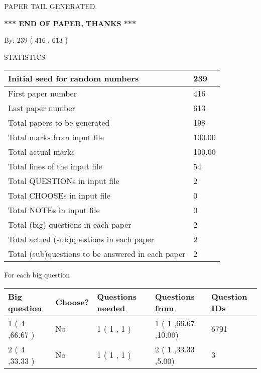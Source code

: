 \documentclass[12pt]{article}
\begin{document}
   
   
\vspace{2.0in} PAPER TAIL GENERATED.
   
   
   
   
\vspace{1.0in} 
{\textbf{\large{ *** END OF PAPER, THANKS *** }}} 
   
   
\hspace{1.0in} By: 
 239 ( 416 ,  613 )
   
   
   
\vspace{0.2in}
\vspace{0.2in}
   
   
 \newpage
\setcounter{page}{1} 
   
   
 {\LARGE{STATISTICS}}
   
\vspace{0.2in}
   
 \begin{tabular}{|l|l|}
 \hline
 Initial seed for random numbers & 239  \\
\hline
 First paper number & 416  \\
\hline
 Last  paper number & 613  \\
\hline
 Total papers to be generated & 198  \\
\hline
Total marks from input file & 100.00 \\
\hline
Total actual marks & 100.00 \\
\hline
 Total lines of the input file & 54  \\
 \hline
 Total QUESTIONs in input file & 2  \\
\hline
 Total CHOOSEs in input file & 0  \\
\hline
 Total NOTEs in input file & 0  \\
\hline
 Total (big) questions in each paper & 2  \\
\hline
 Total actual (sub)questions in each paper & 2  \\
\hline
 Total (sub)questions to be answered in each paper & 2  \\
\hline
 \end{tabular}
   
   
 \newpage
   
{\LARGE{For each big question}}
   
   
\vspace{0.2in}
   
   
\noindent\hspace{-0.4in}\begin{tabular}{|l|l|l|l|l|}
\hline
 Big question & Choose? & Questions needed & Questions from & Question IDs \\ 
\hline
 1 ( 4 ,66.67
 ) &  No   & 
 1 ( 1 ,  1 ) &  1 ( 1
,66.67
 ,10.00) &  6791  \\
 \hline
 2 ( 4 ,33.33
 ) &  No   & 
 1 ( 1 ,  1 ) &  2 ( 1
,33.33
 ,5.00) &  3  \\
 \hline
 \end{tabular}
 
 
\end{document}

